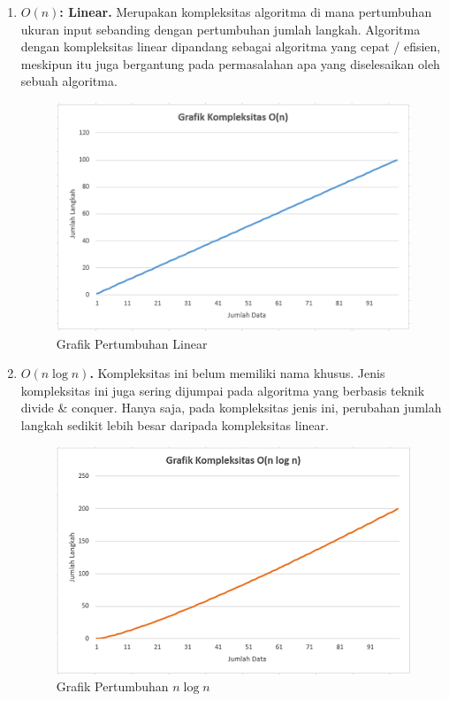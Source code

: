 \begin{enumerate}
    \FloatBarrier

    \item \textbf{$O (n)$: Linear.} Merupakan kompleksitas algoritma di mana pertumbuhan ukuran input sebanding dengan pertumbuhan jumlah langkah. Algoritma dengan kompleksitas linear dipandang sebagai algoritma yang cepat / efisien, meskipun itu juga bergantung pada permasalahan apa yang diselesaikan oleh sebuah algoritma.

    \begin{figure}
        \centering
        \includegraphics[width=\textwidth]{fig/LinearGrowth}
        \caption{Grafik Pertumbuhan Linear}
    \end{figure}

    \FloatBarrier

    \item \textbf{$O (n \log n)$.} Kompleksitas ini belum memiliki nama khusus. Jenis kompleksitas ini juga sering dijumpai pada algoritma yang berbasis teknik divide \& conquer. Hanya saja, pada kompleksitas jenis ini, perubahan jumlah langkah sedikit lebih besar daripada kompleksitas linear.

    \begin{figure}
        \centering
        \includegraphics[width=\textwidth]{fig/NLogNGrowth}
        \caption{Grafik Pertumbuhan $n \log n$}
    \end{figure}


\end{enumerate}
